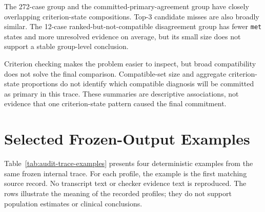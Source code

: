 The 272-case group and the committed-primary-agreement group have closely overlapping criterion-state compositions. Top-3 candidate misses are also broadly similar. The 12-case ranked-but-not-compatible disagreement group has fewer \texttt{met} states and more unresolved evidence on average, but its small size does not support a stable group-level conclusion.

Criterion checking makes the problem easier to inspect, but broad compatibility does not solve the final comparison. Compatible-set size and aggregate criterion-state proportions do not identify which compatible diagnosis will be committed as primary in this trace. These summaries are descriptive associations, not evidence that one criterion-state pattern caused the final commitment.

\section{Selected Frozen-Output Examples}
\label{sec:ch8-trace-boundaries}

Table~\ref{tab:audit-trace-examples} presents four deterministic examples from the same frozen internal trace. For each profile, the example is the first matching source record. No transcript text or checker evidence text is reproduced. The rows illustrate the meaning of the recorded profiles; they do not support population estimates or clinical conclusions.

